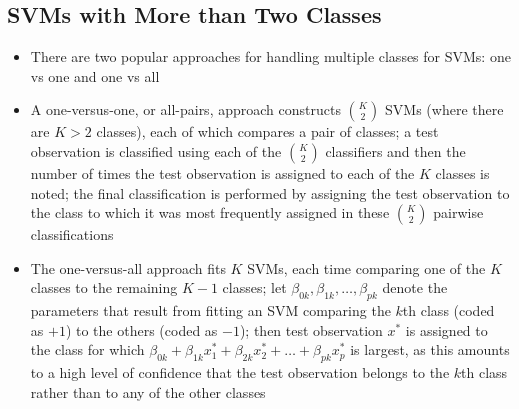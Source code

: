 \documentclass[12pt]{article}
\begin{document}
\subsection{SVMs with More than Two Classes} 
\begin{itemize}
\item There are two popular approaches for handling multiple classes for SVMs: one vs one and one vs all
\item A one-versus-one, or all-pairs, approach constructs $\binom{K}{2}$ SVMs (where there are $K>2$ classes), each of which compares a pair of classes; a test observation is classified using each of the $\binom{K}{2}$ classifiers and then the number of times the test observation is assigned to each of the $K$ classes is noted; the final classification is performed by assigning the test observation to the class to which it was most frequently assigned in these $\binom{K}{2}$ pairwise classifications
\item The one-versus-all approach fits $K$ SVMs, each time comparing one of the $K$ classes to the remaining $K-1$ classes; let $\beta_{0k},\beta_{1k},\dots,\beta_{pk}$ denote the parameters that result from fitting an SVM comparing the $k$th class (coded as $+1$) to the others (coded as $-1$); then test observation $x^\ast$ is assigned to the class for which $\beta_{0k} + \beta_{1k}x^\ast_1 + \beta_{2k}x^\ast_2 + \dots + \beta_{pk}x^\ast_p$ is largest, as this amounts to a high level of confidence that the test observation belongs to the $k$th class rather than to any of the other classes 
\end{itemize}
\end{document}
